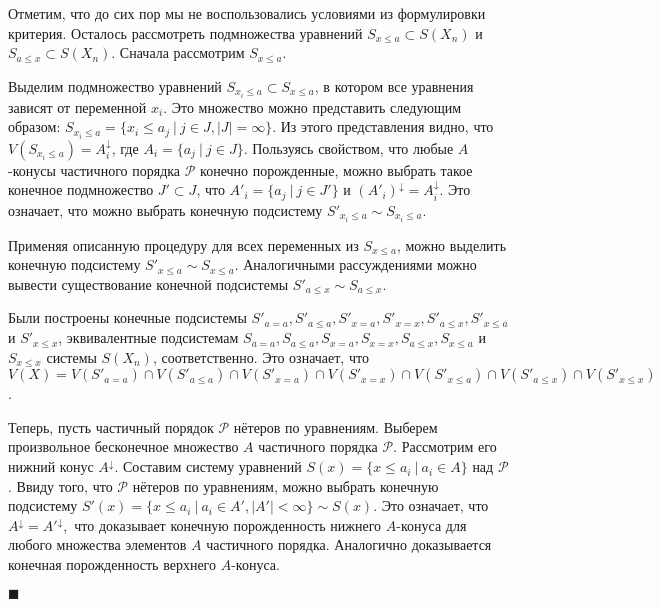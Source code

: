 \documentclass[12pt]{article}
\theoremstyle{break}
\newenvironment{Proof} %
	{\par\noindent{\bf Доказательство.}} %
	{\hfill$\scriptstyle\blacksquare$} %
\def\P{\mathcal{P}}
\begin{document}
\begin{Proof}
			Отметим, что до сих пор мы не воспользовались условиями из формулировки критерия. Осталось рассмотреть подмножества уравнений $S_{x\leqslant a}\subset S(X_n)$ и $S_{a\leqslant x}\subset S(X_n)$. Сначала рассмотрим $S_{x\leqslant a}$.

			Выделим подмножество уравнений $S_{x_i\leqslant a}\subset S_{x\leqslant a}$, в котором все уравнения зависят от переменной $x_i$. Это множество можно представить следующим образом: $S_{x_i\leqslant a}=\{x_i\leqslant a_j\ |\ j\in J, |J| = \infty\}.$ Из этого представления видно, что $V(S_{x_i\leqslant a}) = A_i^{\downarrow}$, где $A_i = \{a_j\ |\ j\in J\}$. Пользуясь свойством, что любые $A$-конусы частичного порядка $\P$ конечно порожденные, можно выбрать такое конечное подмножество $J'\subset J$, что $A'_i = \{a_j\ |\ j\in J'\}$ и $(A'_i)^{\downarrow} = A_i^{\downarrow}.$ Это означает, что можно выбрать конечную подсистему $S'_{x_i\leqslant a}\sim S_{x_i\leqslant a}$.

			Применяя описанную процедуру для всех переменных из $S_{x\leqslant a}$, можно выделить конечную подсистему $S'_{x\leqslant a}\sim S_{x\leqslant a}.$ Аналогичными рассуждениями можно вывести существование конечной подсистемы $S'_{a\leqslant x}\sim S_{a\leqslant x}.$

			Были построены конечные подсистемы $S'_{a=a}, S'_{a\leqslant a}, S'_{x=a}, S'_{x=x}, S'_{a\leqslant x}, S'_{x\leqslant a}$ и $S'_{x\leqslant x}$, эквивалентные подсистемам $S_{a=a}, S_{a\leqslant a}, S_{x=a}, S_{x=x}, S_{a\leqslant x}, S_{x\leqslant a}$ и $S_{x\leqslant x}$ системы $S(X_n)$, соответственно. Это означает, что $V(X) = V(S'_{a=a})\cap V(S'_{a\leqslant a})\cap V(S'_{x=a})\cap V(S'_{x=x})\cap V(S'_{x\leqslant a})\cap V(S'_{a\leqslant x})\cap V(S'_{x\leqslant x})$.

			Теперь, пусть частичный порядок $\P$ нётеров по уравнениям. Выберем произвольное бесконечное множество $A$ частичного порядка $\P$. Рассмотрим его нижний конус $A^{\downarrow}$. Составим систему уравнений $S(x) = \{x\leqslant a_i\ |\ a_i\in A\}$ над $\P$. Ввиду того, что $\P$ нётеров по уравнениям, можно выбрать конечную подсистему $S'(x)=\{x\leqslant a_i\ |\ a_i\in A', |A'|<\infty\}\sim S(x)$. Это означает, что $A^{\downarrow} = A'^{\downarrow},$ что доказывает конечную порожденность нижнего $A$-конуса для любого множества элементов $A$ частичного порядка. Аналогично доказывается конечная порожденность верхнего $A$-конуса.

		\end{Proof}
\end{document}
